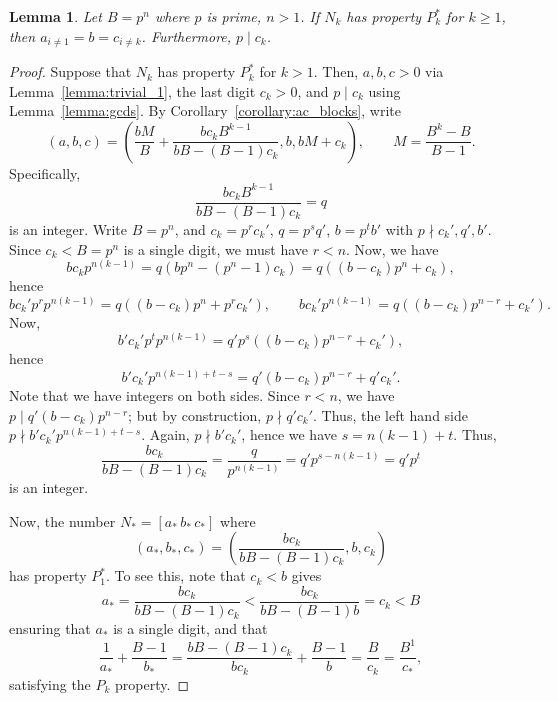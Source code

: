 \documentclass[sn-mathphys]{sn-jnl}%
\theoremstyle{thmstyleone}%
\newtheorem{lemma}[theorem]{Lemma}
\theoremstyle{thmstyletwo}%
\theoremstyle{thmstylethree}%
\begin{document}
\begin{appendices}
\begin{lemma} \label{lemma:pn_extension}
    Let $B = p^n$ where $p$ is prime, $n > 1$. If $N_k$ has property $P^*_k$ for 
    $k \geq 1$, then $a_{i \neq 1} = b = c_{i \neq k}$. Furthermore, $p \mid c_k$.
\end{lemma}
\begin{proof}
    Suppose that $N_k$ has property $P^*_k$ for $k > 1$. Then, $a, b, c > 0$ via
    Lemma~\ref{lemma:trivial_1}, the last digit $c_k > 0$, and $p\mid c_k$ using 
    Lemma~\ref{lemma:gcds}. By Corollary~\ref{corollary:ac_blocks}, write \[
        (a, b, c) = \left(\frac{bM}{B} + \frac{bc_kB^{k - 1}}{bB - (B - 1)c_k}, 
        b, bM + c_k\right), \qquad
        M = \frac{B^k - B}{B - 1}.
    \] Specifically, \[
        \frac{bc_k B^{k - 1}}{bB - (B - 1)c_k} = q
    \] is an integer. Write $B = p^n$, and $c_k = p^rc_k'$, $q = p^sq'$, $b = p^t b'$ with 
    $p\nmid c_k', q', b'$. Since $c_k < B = p^n$ is a single digit, we must have $r < n$.
    Now, we have \[
        bc_k p^{n(k - 1)} = q(bp^n - (p^n - 1)c_k) = q((b - c_k)p^n + c_k),
    \] hence \[
        bc_k' p^rp^{n(k - 1)} = q((b - c_k)p^n + p^rc_k'), \qquad
        bc_k' p^{n(k - 1)} = q((b - c_k)p^{n - r} + c_k').
    \] Now, \[
        b'c_k'p^t p^{n(k - 1)} = q'p^s((b - c_k)p^{n - r} + c_k'),
    \] hence \[
        b'c_k' p^{n(k - 1) + t - s} = q'(b - c_k)p^{n - r} + q'c_k'.
    \] Note that we have integers on both sides. Since $r < n$, we have 
    $p\mid q'(b - c_k)p^{n - r}$; but by construction, $p\nmid q'c_k'$. Thus, the left
    hand side $p\nmid b'c_k' p^{n(k - 1) + t - s}$. Again, $p \nmid b'c_k'$, hence we have
    $s = n(k - 1) + t$. Thus, \[
        \frac{bc_k}{bB - (B - 1)c_k} = \frac{q}{p^{n(k - 1)}} = q' p^{s - n(k - 1)} = q' p^t
    \] is an integer.

    Now, the number $N_* = [a_*\,b_*\,c_*]$ where \[
        (a_*, b_*, c_*) = \left(\frac{bc_k}{bB - (B - 1)c_k}, b, c_k\right)
    \] has property $P^*_1$. To see this, note that $c_k < b$ gives \[
        a_* = \frac{bc_k}{bB - (B - 1)c_k} < \frac{bc_k}{bB - (B - 1)b} = c_k < B
    \] ensuring that $a_*$ is a single digit, and that \[
        \frac{1}{a_*} + \frac{B - 1}{b_*} = \frac{bB - (B - 1)c_k}{bc_k} + \frac{B - 1}{b} = 
        \frac{B}{c_k} = \frac{B^1}{c_*},
    \] satisfying the $P_k$ property.


\end{proof}
\end{appendices}
\end{document}
